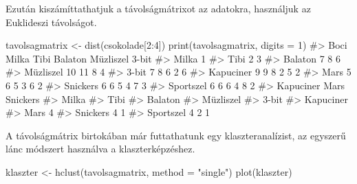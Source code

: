 \documentclass[
  letterpaper,
]{krantz}
\makeatletter
\newenvironment{Shaded}{\begin{snugshade}}{\end{snugshade}}
\newcommand{\AttributeTok}[1]{\textcolor[rgb]{0.40,0.45,0.13}{#1}}
\newcommand{\CommentTok}[1]{\textcolor[rgb]{0.37,0.37,0.37}{#1}}
\newcommand{\DecValTok}[1]{\textcolor[rgb]{0.68,0.00,0.00}{#1}}
\newcommand{\FunctionTok}[1]{\textcolor[rgb]{0.28,0.35,0.67}{#1}}
\newcommand{\NormalTok}[1]{\textcolor[rgb]{0.00,0.23,0.31}{#1}}
\newcommand{\OtherTok}[1]{\textcolor[rgb]{0.00,0.23,0.31}{#1}}
\newcommand{\SpecialCharTok}[1]{\textcolor[rgb]{0.37,0.37,0.37}{#1}}
\newcommand{\StringTok}[1]{\textcolor[rgb]{0.13,0.47,0.30}{#1}}
\newenvironment{kframe}{%
\medskip{}
\setlength{\fboxsep}{.8em}
 \def\at@end@of@kframe{}%
 \ifinner\ifhmode%
  \def\at@end@of@kframe{\end{minipage}}%
  \begin{minipage}{\columnwidth}%
 \fi\fi%
 \def\FrameCommand##1{\hskip\@totalleftmargin \hskip-\fboxsep
 \colorbox{shadecolor}{##1}\hskip-\fboxsep
     \hskip-\linewidth \hskip-\@totalleftmargin \hskip\columnwidth}%
 \MakeFramed {\advance\hsize-\width
   \@totalleftmargin\z@ \linewidth\hsize
   \@setminipage}}%
 {\par\unskip\endMakeFramed%
 \at@end@of@kframe}
\renewenvironment{Shaded}{\begin{kframe}}{\end{kframe}}
\makeatother
\begin{document}
Ezután kiszámíttathatjuk a távolságmátrixot az adatokra, használjuk az
Euklideszi távolságot.

\begin{Shaded}
\begin{Highlighting}[]
\NormalTok{tavolsagmatrix }\OtherTok{\textless{}{-}} \FunctionTok{dist}\NormalTok{(csokolade[}\DecValTok{2}\SpecialCharTok{:}\DecValTok{4}\NormalTok{])}
\FunctionTok{print}\NormalTok{(tavolsagmatrix, }\AttributeTok{digits =} \DecValTok{1}\NormalTok{)}
\CommentTok{\#\textgreater{}           Boci Milka Tibi Balaton Müzliszel 3{-}bit}
\CommentTok{\#\textgreater{} Milka        1                                   }
\CommentTok{\#\textgreater{} Tibi         2     3                             }
\CommentTok{\#\textgreater{} Balaton      7     8    6                        }
\CommentTok{\#\textgreater{} Müzliszel   10    11    8       4                }
\CommentTok{\#\textgreater{} 3{-}bit        7     8    6       2         6      }
\CommentTok{\#\textgreater{} Kapuciner    9     9    8       2         5     2}
\CommentTok{\#\textgreater{} Mars         5     6    5       3         6     2}
\CommentTok{\#\textgreater{} Snickers     6     6    5       4         7     3}
\CommentTok{\#\textgreater{} Sportszel    6     6    6       4         8     2}
\CommentTok{\#\textgreater{}           Kapuciner Mars Snickers}
\CommentTok{\#\textgreater{} Milka                            }
\CommentTok{\#\textgreater{} Tibi                             }
\CommentTok{\#\textgreater{} Balaton                          }
\CommentTok{\#\textgreater{} Müzliszel                        }
\CommentTok{\#\textgreater{} 3{-}bit                            }
\CommentTok{\#\textgreater{} Kapuciner                        }
\CommentTok{\#\textgreater{} Mars              4              }
\CommentTok{\#\textgreater{} Snickers          4    1         }
\CommentTok{\#\textgreater{} Sportszel         4    2        1}
\end{Highlighting}
\end{Shaded}

A távolságmátrix birtokában már futtathatunk egy klaszteranalízist, az
egyszerű lánc módszert használva a klaszterképzéshez.

\begin{Shaded}
\begin{Highlighting}[]
\NormalTok{klaszter }\OtherTok{\textless{}{-}} \FunctionTok{hclust}\NormalTok{(tavolsagmatrix, }\AttributeTok{method =} \StringTok{"single"}\NormalTok{)}
\FunctionTok{plot}\NormalTok{(klaszter)}
\end{Highlighting}
\end{Shaded}
\end{document}

